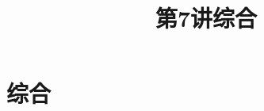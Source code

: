 \section{综合}

\title[第7讲\quad 综合]{第7讲\quad 综合} 
\author{}
\date{}

\begin{frame}
    \titlepage
\end{frame}

\setcounter{framecounter}{0}




